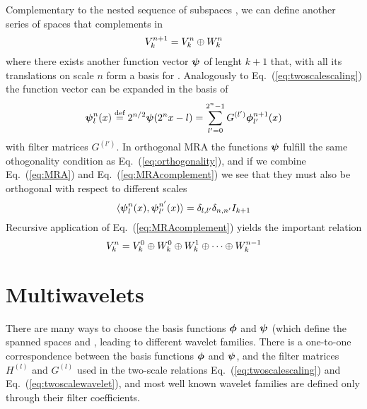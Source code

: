 Complementary to the nested sequence of subspaces , we can define 
another series of spaces  that complements  in 
\begin{equation}
    \label{eq:MRAcomplement}
    {V}_{k}^{n+1} = {V}_{k}^{n} \oplus {W}_{k}^{n}
\end{equation}
where there exists another function vector $\boldsymbol{\psi}$ of lenght $k+1$ that, with 
all its translations on scale $n$ form a basis for .
Analogously to Eq.~(\ref{eq:twoscalescaling}) the function vector can be expanded 
in the basis of 
\begin{equation}
    \label{eq:twoscalewavelet}
    \boldsymbol{\psi}^n_l(x) \stackrel{\text{def}}{\hbox{=}} 2^{n/2}\boldsymbol{\psi}(2^nx-l) = 
	\sum_{l'=0}^{2^n-1} G^{(l')}\boldsymbol{\phi}_{l'}^{n+1}(x)
\end{equation}
with filter matrices $G^{(l')}$. In orthogonal MRA the functions $\boldsymbol{\psi}$ fulfill 
the same othogonality condition as Eq.~(\ref{eq:orthogonality}), and if we combine 
Eq.~(\ref{eq:MRA}) and Eq.~(\ref{eq:MRAcomplement}) we see that they must also be 
orthogonal with respect to different scales
\begin{equation}
    \langle \boldsymbol{\psi}_l^n(x), \boldsymbol{\psi}_{l'}^{n'}(x) \rangle = 
	\delta_{l,l'}\delta_{n,n'}I_{k+1}
\end{equation}
Recursive application of Eq.~(\ref{eq:MRAcomplement}) yields the important relation
\begin{equation}
    \label{eq:MRArecursive}
    {V}_{k}^{n} = {V}_{k}^{0} \oplus {W}_{k}^{0} \oplus {W}_{k}^{1}
	\oplus \cdots \oplus {W}_{k}^{n-1}
\end{equation}

\section{Multiwavelets}
There are many ways to choose the basis functions $\boldsymbol{\phi}$ and $\boldsymbol{\psi}$ 
(which define the spanned spaces  and ,
leading to different wavelet families. There is a one-to-one correspondence between 
the basis functions $\boldsymbol{\phi}$ and $\boldsymbol{\psi}$, and the filter matrices $H^{(l)}$ 
and $G^{(l)}$ used in the two-scale relations Eq.~(\ref{eq:twoscalescaling}) and 
Eq.~(\ref{eq:twoscalewavelet}), and most well known wavelet families are defined 
only through their filter coefficients.


